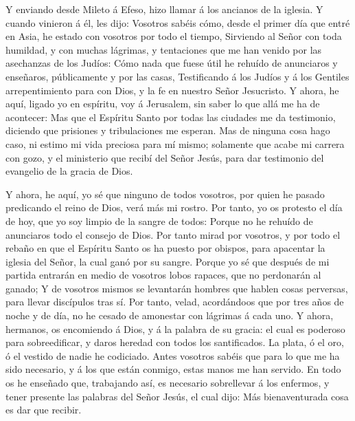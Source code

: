  Y enviando desde Mileto á Efeso, hizo llamar á los
ancianos de la iglesia.  Y cuando vinieron á él, les
dijo: Vosotros sabéis cómo, desde el primer día que entré en Asia, he
estado con vosotros por todo el tiempo,  Sirviendo al
Señor con toda humildad, y con muchas lágrimas, y tentaciones que me han
venido por las asechanzas de los Judíos:  Cómo nada que
fuese útil he rehuído de anunciaros y enseñaros, públicamente y por las
casas,  Testificando á los Judíos y á los Gentiles
arrepentimiento para con Dios, y la fe en nuestro Señor Jesucristo.
 Y ahora, he aquí, ligado yo en espíritu, voy á
Jerusalem, sin saber lo que allá me ha de acontecer:  Mas
que el Espíritu Santo por todas las ciudades me da testimonio, diciendo
que prisiones y tribulaciones me esperan.  Mas de ninguna
cosa hago caso, ni estimo mi vida preciosa para mí mismo; solamente que
acabe mi carrera con gozo, y el ministerio que recibí del Señor Jesús,
para dar testimonio del evangelio de la gracia de Dios.

 Y ahora, he aquí, yo sé que ninguno de todos vosotros,
por quien he pasado predicando el reino de Dios, verá más mi rostro.
 Por tanto, yo os protesto el día de hoy, que yo soy
limpio de la sangre de todos:  Porque no he rehuído de
anunciaros todo el consejo de Dios.  Por tanto mirad por
vosotros, y por todo el rebaño en que el Espíritu Santo os ha puesto por
obispos, para apacentar la iglesia del Señor, la cual ganó por su
sangre.  Porque yo sé que después de mi partida entrarán
en medio de vosotros lobos rapaces, que no perdonarán al ganado;
 Y de vosotros mismos se levantarán hombres que hablen
cosas perversas, para llevar discípulos tras sí.  Por
tanto, velad, acordándoos que por tres años de noche y de día, no he
cesado de amonestar con lágrimas á cada uno.  Y ahora,
hermanos, os encomiendo á Dios, y á la palabra de su gracia: el cual es
poderoso para sobreedificar, y daros heredad con todos los santificados.
 La plata, ó el oro, ó el vestido de nadie he codiciado.
 Antes vosotros sabéis que para lo que me ha sido
necesario, y á los que están conmigo, estas manos me han servido.
 En todo os he enseñado que, trabajando así, es necesario
sobrellevar á los enfermos, y tener presente las palabras del Señor
Jesús, el cual dijo: Más bienaventurada cosa es dar que recibir.

